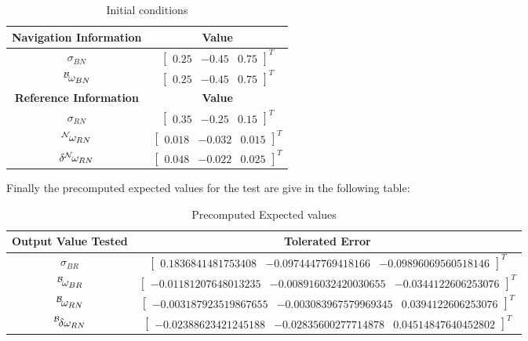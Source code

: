 \begin{table}[htbp]
	\caption{Initial conditions}
	\label{tab:ICs}
	\centering \fontsize{10}{10}\selectfont
	\begin{tabular}{ c | c } %
		\hline\hline
		\textbf{Navigation Information}  &  \textbf{Value}  \\ 
		\hline
		$\sigma_{BN}$        & $\begin{bmatrix} 0.25 & -0.45 & 0.75\end{bmatrix}^T$	   \\ 
		$\leftexp{B}{\omega_{BN}}$ &  $\begin{bmatrix} 0.25 & -0.45 & 0.75\end{bmatrix}^T$	   \\ 
		\hline\hline
		\textbf{Reference Information}  &  \textbf{Value}  \\ 
		\hline
		$\sigma_{RN}$ &  $\begin{bmatrix} 0.35 & -0.25& 0.15\end{bmatrix}^T$	   \\ 
		$\leftexp{N}{\omega_{RN}}$ &  $\begin{bmatrix} 0.018 & -0.032 & 0.015\end{bmatrix}^T$	   \\
		$\delta \leftexp{N}{\omega_{RN}}$ &  $\begin{bmatrix} 0.048& -0.022& 0.025 \end{bmatrix}^T$	   \\
		\hline\hline
	\end{tabular}
\end{table}

Finally the precomputed expected values for the test are give in the following table:

\begin{table}[htbp]
	\caption{Precomputed Expected values}
	\label{tab:exp}
	\centering \fontsize{10}{10}\selectfont
	\begin{tabular}{ c | c } %
		\hline\hline
		\textbf{Output Value Tested}  &  \textbf{Tolerated Error}  \\ 
		\hline
		$\sigma_{BR}$        &$\begin{bmatrix}0.1836841481753408 & -0.0974447769418166 & -0.09896069560518146\end{bmatrix}^T$	   \\ 
		$\leftexp{B}{\omega_{BR}}$ & $\begin{bmatrix}-0.01181207648013235 &-0.008916032420030655 &-0.0344122606253076\end{bmatrix}^T$	   \\ 
		$\leftexp{B}{\omega_{RN}}$ & $\begin{bmatrix} -0.003187923519867655 &-0.003083967579969345 &0.0394122606253076\end{bmatrix}^T$  \\ 
		$\leftexp{B}{\delta \omega_{RN}}$ &$\begin{bmatrix} -0.02388623421245188 &-0.02835600277714878 & 0.04514847640452802\end{bmatrix}^T$	   \\
		\hline\hline
	\end{tabular}
\end{table}


